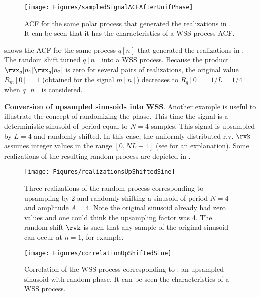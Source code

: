 \begin{figure}[htbp]
\centering
\texttt{[image: Figures/sampledSignalACFAfterUnifPhase]}
\caption[{ACF for the same polar process that generated the realizations in .}]{ACF for the same polar process that generated the realizations in . It can be seen that it has the characteristics of a WSS process ACF.\label{fig:sampledSignalACFAfterUnifPhase}}
\end{figure}

 shows the ACF for the same process $q[n]$ that generated the realizations in . The random shift turned $q[n]$ into a WSS process. Because the product $\rvx_q[n_1] \rvx_q[n_2]$ is zero for several pairs of realizations, the original value $R_m[0]=1$
(obtained for the signal $m[n]$)
decreases to $R_q[0]=1/L=1/4$ when $q[n]$ is considered.
\eExample 

\bExample \textbf{Conversion of upsampled sinusoids into WSS}.
Another example is useful to illustrate the concept of randomizing the phase. This time the signal is a deterministic sinusoid of period equal to $N=4$ samples.
This signal is upsampled by $L=4$ and randomly shifted. In this case, the uniformly distributed r.v. $\rvk$ assumes integer values in the range $[0, N L-1]$ (see  for an explanation). Some realizations of the resulting random process are depicted in .

\begin{figure}[htbp]
\centering
\texttt{[image: Figures/realizationsUpShiftedSine]}
\caption[{Three realizations of the random process corresponding to upsampling by 2 and randomly shifting a sinusoid of period $N=4$ and amplitude $A=4$.}]{Three realizations of the random process corresponding to upsampling by 2 and randomly shifting a sinusoid of period $N=4$ and amplitude $A=4$. Note the original sinusoid already had zero values and one could think the upsampling factor was 4. The random shift $\rvk$ is such that any sample of the original sinusoid can occur at $n=1$, for example. \label{fig:realizationsUpShiftedSine}}
\end{figure}

\begin{figure}[htbp]
\centering
\texttt{[image: Figures/correlationUpShiftedSine]}
\caption[{Correlation of the WSS process corresponding to .}]{Correlation of the WSS process corresponding to : an upsampled sinusoid with random phase. It can be seen the characteristics of a WSS process.\label{fig:correlationUpShiftedSine}}
\end{figure}

